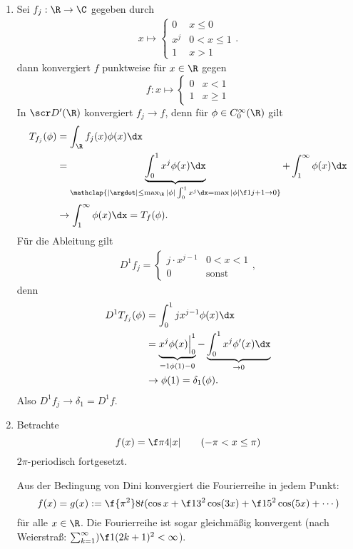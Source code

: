 \begin{ex} \label{5.17}
	\begin{enumerate}[1)]
		\item
			Sei $f_j: \R \to \C$ gegeben durch
			\begin{align*}
				x \mapsto \begin{cases}
					0 & x \le 0 \\
					x^j & 0 < x \le 1 \\
					1 & x > 1
				\end{cases}.
			\end{align*}
			dann konvergiert $f$ punktweise für $x \in \R$ gegen
			\[
				f: x \mapsto \begin{cases}
					0 & x < 1 \\
					1 & x \ge 1
				\end{cases}
			\]
			In $\scr D'(\R)$ konvergiert $f_j \to f$, denn für $\phi \in C_0^\infty(\R)$ gilt
			\begin{align*}
				T_{f_j}(\phi) 
				&= \int_{\R} f_j(x) \phi(x) \dx \\
				&= \underbrace{\int_{0}^1 x^j \phi(x) \dx}_{\mathclap{|\argdot| \le \max_{\R}|\phi| \int_0^1 x^j \dx = \max |\phi| \f 1{j+1} \to 0}} + \int_{1}^\infty \phi(x) \dx \\
				&\to \int_{1}^\infty \phi(x) \dx
				= T_f(\phi).
			\end{align*}
			Für die Ableitung gilt
			\begin{align*}
				D^1  f_j = \begin{cases}
					j \cdot x^{j-1} & 0 < x < 1 \\
					0 & \text{sonst}
				\end{cases},
			\end{align*}
			denn
			\begin{align*}
				D^1 T_{f_j}(\phi)
				&= \int_{0}^1 j x^{j-1} \phi(x) \dx \\
				&= \underbrace{x^j \phi(x) \Big|_0^1}_{=1 \phi(1) - 0} - \underbrace{\int_{0}^1 x^j \phi'(x) \dx}_{\to 0} \\
				&\to \phi(1) = \delta_1(\phi).
			\end{align*}
			Also $D^1 f_j \to \delta_1 = D^1 f$.
		\item
			Betrachte
			\[
				f(x) = \f \pi4 |x|
				\qquad (-\pi < x \le \pi)
			\]
			$2\pi$-periodisch fortgesetzt.
			
			Aus der Bedingung von Dini konvergiert die Fourierreihe in jedem Punkt:
			\[
				f(x) = g(x) := \f {\pi^2}8 t ( \cos x + \f 1{3^2} \cos (3x) + \f 1{5^2} \cos(5x) + \dotsb )
			\]
			für alle $x \in \R$.
			Die Fourierreihe ist sogar gleichmäßig konvergent (nach Weierstraß: $\sum_{k=1}^\infty) \f 1{(2k+1)^2} < \infty$).


\end{enumerate}
\end{ex}
